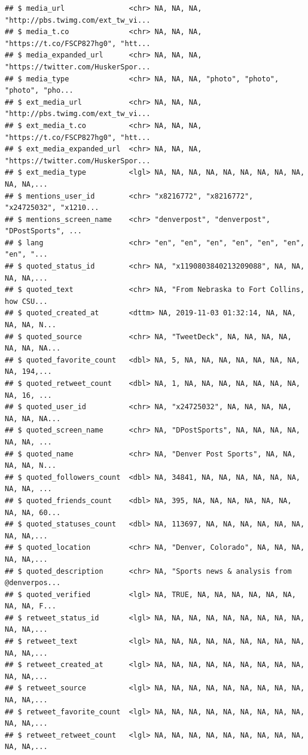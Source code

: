\documentclass[
]{book}
\begin{document}
\begin{verbatim}
## $ media_url               <chr> NA, NA, NA, "http://pbs.twimg.com/ext_tw_vi...
## $ media_t.co              <chr> NA, NA, NA, "https://t.co/FSCP827hg0", "htt...
## $ media_expanded_url      <chr> NA, NA, NA, "https://twitter.com/HuskerSpor...
## $ media_type              <chr> NA, NA, NA, "photo", "photo", "photo", "pho...
## $ ext_media_url           <chr> NA, NA, NA, "http://pbs.twimg.com/ext_tw_vi...
## $ ext_media_t.co          <chr> NA, NA, NA, "https://t.co/FSCP827hg0", "htt...
## $ ext_media_expanded_url  <chr> NA, NA, NA, "https://twitter.com/HuskerSpor...
## $ ext_media_type          <lgl> NA, NA, NA, NA, NA, NA, NA, NA, NA, NA, NA,...
## $ mentions_user_id        <chr> "x8216772", "x8216772", "x24725032", "x1210...
## $ mentions_screen_name    <chr> "denverpost", "denverpost", "DPostSports", ...
## $ lang                    <chr> "en", "en", "en", "en", "en", "en", "en", "...
## $ quoted_status_id        <chr> NA, "x1190803840213209088", NA, NA, NA, NA,...
## $ quoted_text             <chr> NA, "From Nebraska to Fort Collins, how CSU...
## $ quoted_created_at       <dttm> NA, 2019-11-03 01:32:14, NA, NA, NA, NA, N...
## $ quoted_source           <chr> NA, "TweetDeck", NA, NA, NA, NA, NA, NA, NA...
## $ quoted_favorite_count   <dbl> NA, 5, NA, NA, NA, NA, NA, NA, NA, NA, 194,...
## $ quoted_retweet_count    <dbl> NA, 1, NA, NA, NA, NA, NA, NA, NA, NA, 16, ...
## $ quoted_user_id          <chr> NA, "x24725032", NA, NA, NA, NA, NA, NA, NA...
## $ quoted_screen_name      <chr> NA, "DPostSports", NA, NA, NA, NA, NA, NA, ...
## $ quoted_name             <chr> NA, "Denver Post Sports", NA, NA, NA, NA, N...
## $ quoted_followers_count  <dbl> NA, 34841, NA, NA, NA, NA, NA, NA, NA, NA, ...
## $ quoted_friends_count    <dbl> NA, 395, NA, NA, NA, NA, NA, NA, NA, NA, 60...
## $ quoted_statuses_count   <dbl> NA, 113697, NA, NA, NA, NA, NA, NA, NA, NA,...
## $ quoted_location         <chr> NA, "Denver, Colorado", NA, NA, NA, NA, NA,...
## $ quoted_description      <chr> NA, "Sports news & analysis from @denverpos...
## $ quoted_verified         <lgl> NA, TRUE, NA, NA, NA, NA, NA, NA, NA, NA, F...
## $ retweet_status_id       <lgl> NA, NA, NA, NA, NA, NA, NA, NA, NA, NA, NA,...
## $ retweet_text            <lgl> NA, NA, NA, NA, NA, NA, NA, NA, NA, NA, NA,...
## $ retweet_created_at      <lgl> NA, NA, NA, NA, NA, NA, NA, NA, NA, NA, NA,...
## $ retweet_source          <lgl> NA, NA, NA, NA, NA, NA, NA, NA, NA, NA, NA,...
## $ retweet_favorite_count  <lgl> NA, NA, NA, NA, NA, NA, NA, NA, NA, NA, NA,...
## $ retweet_retweet_count   <lgl> NA, NA, NA, NA, NA, NA, NA, NA, NA, NA, NA,...

\end{verbatim}
\end{document}
